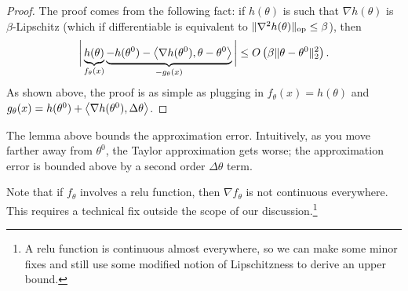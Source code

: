 \begin{proof}
    The proof comes from the following fact:  if $h(\theta)$ is such that $\nabla h(\theta)$ is $\beta$-Lipschitz (which if differentiable is equivalent to $\|\nabla^2 h(\theta)\|_{\text{op}} \leq \beta$), then
    \begin{align}
        \bigg| \underbrace{h(\theta)}_{f_\theta(x)}  \underbrace{-h(\theta^0) - \left\langle\nabla h(\theta^0), \theta-\theta^0\right\rangle}_{-g_\theta(x)}\bigg| \leq O\left( \beta \|\theta-\theta^0\|_2^2 \right).
    \end{align} 
    As shown above, the proof is as simple as plugging in $f_\theta(x) = h(\theta)$ and $g_\theta(x)=h(\theta^0) + \left\langle\nabla h(\theta^0), \Delta \theta\right\rangle$. 
\end{proof}

\begin{remark}
The lemma above bounds the approximation error. Intuitively, as you move farther away from $\theta^0$, the Taylor approximation gets worse; the approximation error is bounded above by a second order $\Delta \theta$ term.
\end{remark}

\begin{remark}
Note that if $f_\theta$ involves a $\text{relu}$ function, then $\nabla f_\theta$ is not continuous everywhere. This requires a technical fix outside the scope of our discussion.\footnote{A $\text{relu}$ function is continuous almost everywhere, so we can make some minor fixes and still use some modified notion of Lipschitzness to derive an upper bound.} 
\end{remark}

